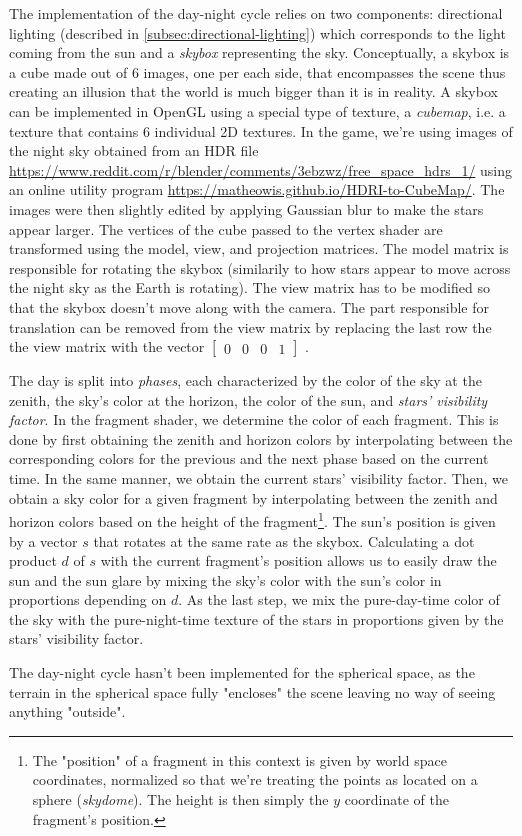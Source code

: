 The implementation of the day-night cycle relies on two components: directional lighting (described in \autoref{subsec:directional-lighting}) which corresponds to the light coming from the sun and a \textit{skybox} representing the sky.
Conceptually, a skybox is a cube made out of 6 images, one per each side, that encompasses the scene thus creating an illusion that the world is much bigger than it is in reality.
A skybox can be implemented in OpenGL using a special type of texture, a \textit{cubemap}, i.e. a texture that contains 6 individual 2D textures.
In the game, we're using images of the night sky obtained from an HDR file \url{https://www.reddit.com/r/blender/comments/3ebzwz/free_space_hdrs_1/} using an online utility program \url{https://matheowis.github.io/HDRI-to-CubeMap/}.
The images were then slightly edited by applying Gaussian blur to make the stars appear larger.
The vertices of the cube passed to the vertex shader are transformed using the model, view, and projection matrices.
The model matrix is responsible for rotating the skybox (similarily to how stars appear to move across the night sky as the Earth is rotating).
The view matrix has to be modified so that the skybox doesn't move along with the camera.
The part responsible for translation can be removed from the view matrix by replacing the last row the the view matrix with the vector $ \begin{bmatrix} 0 & 0 & 0 & 1 \end{bmatrix} $ \cite{LearnOpenGL-Cubemaps}.

The day is split into \textit{phases}, each characterized by the color of the sky at the zenith, the sky's color at the horizon, the color of the sun, and \textit{stars' visibility factor}.
In the fragment shader, we determine the color of each fragment.
This is done by first obtaining the zenith and horizon colors by interpolating between the corresponding colors for the previous and the next phase based on the current time.
In the same manner, we obtain the current stars' visibility factor.
Then, we obtain a sky color for a given fragment by interpolating between the zenith and horizon colors based on the height of the fragment\footnote{The "position" of a fragment in this context is given by world space coordinates, normalized so that we're treating the points as located on a sphere (\textit{skydome}). The height is then simply the $y$ coordinate of the fragment's position.}.
The sun's position is given by a vector $s$ that rotates at the same rate as the skybox.
Calculating a dot product $d$ of $s$ with the current fragment's position allows us to easily draw the sun and the sun glare by mixing the sky's color with the sun's color in proportions depending on $d$.
As the last step, we mix the pure-day-time color of the sky with the pure-night-time texture of the stars in proportions given by the stars' visibility factor.

The day-night cycle hasn't been implemented for the spherical space, as the terrain in the spherical space fully "encloses" the scene leaving no way of seeing anything "outside".